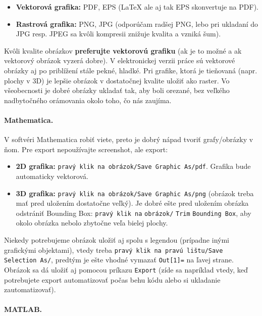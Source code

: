 \begin{itemize}
	\item \textbf{Vektorová grafika:} PDF, EPS (LaTeX ale aj tak EPS skonvertuje na PDF).
	\item \textbf{Rastrová grafika:} PNG, JPG (odporúčam radšej PNG, lebo pri ukladaní do JPG resp. JPEG sa kvôli kompresii znižuje kvalita a vzniká šum).
\end{itemize}
Kvôli kvalite obrázkov \textbf{preferujte vektorovú grafiku} (ak je to možné a ak vektorový obrázok vyzerá dobre). V elektronickej verzii práce sú vektorové obrázky aj po priblížení stále pekné, hladké. Pri grafike, ktorá je tieňovaná (napr. plochy v 3D) je lepšie obrázok v dostatočnej kvalite uložiť ako raster. Vo všeobecnosti je dobré obrázky ukladať tak, aby boli orezané, bez veľkého nadbytočného orámovania okolo toho, čo nás zaujíma.


\paragraph{Mathematica.}

V softvéri Mathematica robiť viete, preto je dobrý nápad tvoriť grafy/obrázky v ňom. Pre export nepoužívajte screenshot, ale export:
\begin{itemize}
	\item \textbf{2D grafika:} \verb|pravý klik na obrázok/Save Graphic As/pdf|. Grafika bude automaticky vektorová.
	\item \textbf{3D grafika:} \verb|pravý klik na obrázok/Save Graphic As/png| (obrázok treba mať pred uložením dostatočne veľký). Je dobré ešte pred uložením obrázka odstrániť Bounding Box: \verb|pravý klik na| \verb|obrázok/| \verb|Trim| \verb|Bounding Box|, aby okolo obrázka nebolo zbytočne veľa bielej plochy.
\end{itemize}
Niekedy potrebujeme obrázok uložiť aj spolu s legendou (prípadne inými grafickými objektami), vtedy treba \verb|pravý klik na pravú lištu/Save Selection As/|, predtým je ešte vhodné vymazať \verb|Out[1]=| na ľavej strane. Obrázok sa dá uložiť aj pomocou príkazu \verb|Export| (zíde sa napríklad vtedy, keď potrebujete export automatizovať počas behu kódu alebo si ukladanie zautomatizovať).


\paragraph{MATLAB.}

